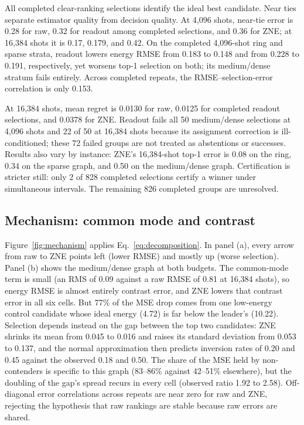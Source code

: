 \documentclass[10pt,twocolumn]{article}
\begin{document}
All completed clear-ranking selections identify the ideal best candidate. Near ties separate
estimator quality from decision quality. At 4,096 shots, near-tie error is 0.28 for raw, 0.32 for
readout among completed selections, and 0.36 for ZNE; at 16,384 shots it is 0.17, 0.179, and 0.42.
On the completed 4,096-shot ring and sparse strata, readout lowers energy RMSE from 0.183 to 0.148
and from 0.228 to 0.191, respectively, yet worsens top-1 selection on both; its medium/dense stratum
fails entirely. Across completed repeats, the RMSE--selection-error correlation is only 0.153.

At 16,384 shots, mean regret is 0.0130 for raw, 0.0125 for completed readout selections, and 0.0378
for ZNE. Readout fails all 50 medium/dense selections at 4,096 shots and 22 of 50 at 16,384 shots
because its assignment correction is ill-conditioned; these 72 failed groups are not treated as
abstentions or successes. Results also vary by instance: ZNE's 16,384-shot top-1 error is 0.08 on
the ring, 0.34 on the sparse graph, and 0.50 on the medium/dense graph. Certification is stricter
still: only 2 of 828 completed selections certify a winner under simultaneous intervals. The
remaining 826 completed groups are unresolved.

\subsection{Mechanism: common mode and contrast}
Figure~\ref{fig:mechanism} applies Eq.~\eqref{eq:decomposition}. In panel (a), every arrow from
raw to ZNE points left (lower RMSE) and mostly up (worse selection). Panel (b) shows the medium/dense graph at both budgets. The common-mode term is
small (an RMS of 0.09 against a raw RMSE of 0.81 at 16,384 shots), so energy RMSE is almost entirely
contrast error, and ZNE lowers that contrast error in all six cells. But 77\% of the MSE drop comes
from one low-energy control candidate whose ideal energy (4.72) is far below the leader's (10.22).
Selection depends instead on the gap between the top two candidates: ZNE shrinks its mean from 0.045
to 0.016 and raises its standard deviation from 0.053 to 0.137, and the normal approximation then
predicts inversion rates of 0.20 and 0.45 against the observed 0.18 and 0.50. The share of the MSE
held by non-contenders is specific to this graph (83--86\% against 42--51\% elsewhere), but the
doubling of the gap's spread recurs in every cell (observed ratio 1.92 to 2.58). Off-diagonal error
correlations across repeats are near zero for raw and ZNE, rejecting the hypothesis that raw rankings
are stable because raw errors are shared.
\end{document}
